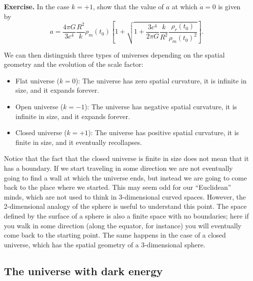 \documentclass[11pt, a4paper,oneside,openright]{book}
\numberwithin{equation}{section}
\begin{document}
\par\vspace{\baselineskip}

{\bf Exercise.} In the case $k=+1$, show that the value of $a$ at which $\dot{a}=0$ is given by
\begin{equation}
a=\frac{4\pi G}{3c^4}\frac{R^2}{k}\rho_m(t_0)\left[1+\sqrt{1+\frac{3c^4}{2\pi G}\frac{k}{R^2}\frac{\rho_r(t_0)}{\rho_m(t_0)^2}}\right].
\end{equation}

\par\vspace{\baselineskip}

We can then distinguish three types of universes depending on the spatial geometry and the evolution of the scale factor:
\begin{itemize}
\item Flat universe ($k=0$): The universe has zero spatial curvature, it is infinite in size, and it expands forever.
\item Open universe ($k=-1$): The universe has negative spatial curvature, it is infinite in size, and it expands forever.
\item Closed universe ($k=+1$): The universe has positive spatial curvature, it is finite in size, and it eventually recollapses.
\end{itemize}
Notice that the fact that the closed universe is finite in size does not mean that it has a boundary. If we start traveling in some direction we are not eventually going to find a wall at which the universe ends, but instead we are going to come back to the place where we started. This may seem odd for our ``Euclidean'' minds, which are not used to think in 3-dimensional curved spaces. However, the 2-dimensional analogy of the sphere is useful to understand this point. The space defined by the surface of a sphere is also a finite space with no boundaries; here if you walk in some direction (along the equator, for instance) you will eventually come back to the starting point. The same happens in the case of a closed universe, which has the spatial geometry of a 3-dimensional sphere.

\subsection{The universe with dark energy}
\end{document}
